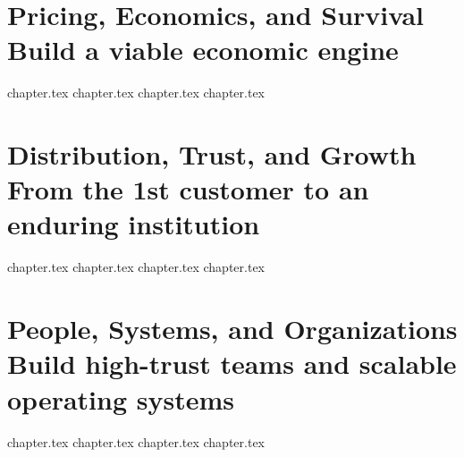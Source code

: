 \documentclass[10pt,letterpaper,twoside,openright,twocolumn]{book}
\begin{document}
  \part[Pricing, Economics, and Survival]{Pricing, Economics, and Survival\\[0.4ex]\fontsize{13}{17}\selectfont\mdseries\color{BayesSecondary}Build a viable economic engine}
  {chapter.tex}
  {chapter.tex}
  {chapter.tex}
  {chapter.tex}

  \part[Distribution, Trust, and Growth]{Distribution, Trust, and Growth\\[0.4ex]\fontsize{13}{17}\selectfont\mdseries\color{BayesSecondary}From the 1st customer to an enduring institution}
  {chapter.tex}
  {chapter.tex}
  {chapter.tex}
  {chapter.tex}

  \part[People, Systems, and Organizations]{People, Systems, and Organizations\\[0.4ex]\fontsize{13}{17}\selectfont\mdseries\color{BayesSecondary}Build high-trust teams and scalable operating systems}
  {chapter.tex}
  {chapter.tex}
  {chapter.tex}
  {chapter.tex}
\end{document}
